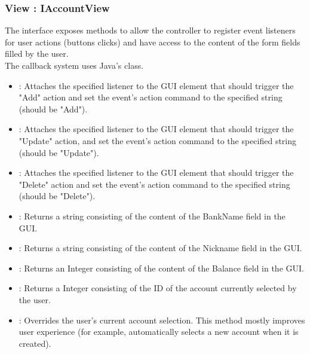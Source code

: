 \documentclass[12pt]{article}
\begin{document}
\subsubsection{View : IAccountView}
The  interface exposes methods to allow the controller to register event listeners for user actions (buttons clicks) and have access to the content of the form fields filled by the user.\\
The callback system uses Java's  class. 
\begin{itemize}
	\item {} : Attaches the specified listener to the GUI element that should trigger the "Add" action and set the event's action command to the specified string (should be "Add").
	\item {} : Attaches the specified listener to the GUI element that should trigger the "Update" action, and set the event's action command to the specified string (should be "Update").
	\item {} : Attaches the specified listener to the GUI element that should trigger the "Delete" action and set the event's action command to the specified string (should be "Delete").
	\item {} : Returns a string consisting of the content of the BankName field in the GUI.
	\item {} : Returns a string consisting of the content of the Nickname field in the GUI.
	\item {} : Returns an Integer consisting of the content of the Balance field in the GUI.
	\item {} : Returns a Integer consisting of the ID of the account currently selected by the user.
	\item {} : Overrides the user's current account selection. This method mostly improves user experience (for example, automatically selects a new account when it is created).
\end{itemize}
\end{document}
